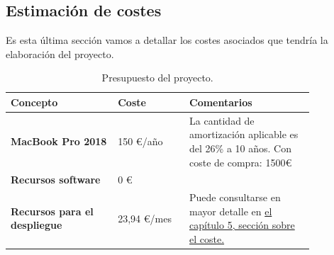 \subsection{Estimación de costes}
Es esta última sección vamos a detallar los costes asociados que tendría la elaboración
del proyecto.

\begin{table}[H]
\centering
    \begin{center}
        \begin{tabular}{| p{0.3\linewidth} | p{0.2\linewidth} | p{0.35\linewidth}|}
            \hline
            \rowcolor[HTML]{ECF4FF} 
            \textbf{Concepto} & \textbf{Coste} & \textbf{Comentarios} \\ \hline
            \textbf{MacBook Pro 2018} & 150 €/año & La cantidad de amortización aplicable es del 26\% a
        10 años. Con coste de compra: 1500€ \\
        \textbf{Recursos software} & 0 € &  \\
        \textbf{Recursos para el despliegue } & 23,94 €/mes & Puede consultarse en mayor
        detalle en \hyperref[sec:despliegue]{el capítulo 5, sección sobre el coste.}  \\
        \hline
        \end{tabular}
        \caption{Presupuesto del proyecto.}
    \end{center}
\end{table}

